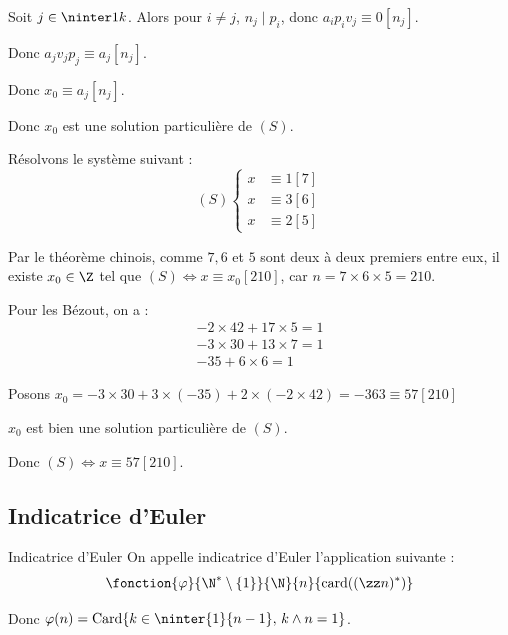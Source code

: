 Soit $j \in \ninter 1 k$. Alors pour $i \neq j$, $n_j \mid p_i$, donc $a_ip_iv_j \equiv 0 [n_j]$.

Donc $a_j v_j p_j \equiv a_j [n_j]$.

Donc $x_0 \equiv a_j [n_j]$.

Donc $x_0$ est une solution particulière de $(S)$.

\begin{exemple}
    Résolvons le système suivant : 
    \[
        (S) \left\{ 
            \begin{aligned}
                x & \equiv 1 [7] \\
                x & \equiv 3 [6] \\
                x & \equiv 2 [5]
            \end{aligned}
        \right.
    \]

    Par le théorème chinois, comme $7, 6$ et $5$ sont deux à deux premiers entre eux, 
    il existe $x_0 \in \Z$ tel que $(S) \Leftrightarrow x \equiv x_0 [210]$, car 
    $n = 7 \times 6 \times 5 = 210$.

    Pour les Bézout, on a :
    \[
        \begin{array}{rcl}
            -2 \times 42 + 17 \times 5 = 1 \\
            -3 \times 30 + 13 \times 7 = 1 \\
            - 35 + 6 \times 6 = 1
        \end{array}
    \]

    Posons $x_0 = -3 \times 30 + 3 \times (-35) + 2 \times (-2 \times 42) = -363 \equiv 57 [210] $

    $x_0$ est bien une solution particulière de $(S)$.

    Donc $(S) \Leftrightarrow x \equiv 57 [210]$.

\end{exemple}


\subsection{Indicatrice d'Euler }

\begin{definition}{Indicatrice d'Euler}{}
    On appelle indicatrice d'Euler l'application suivante : 
    $$\fonction{\varphi}{\N^* \setminus \{1 \}}{\N}{n}{\operatorname{card}((\zz n)^*)}$$

    Donc $\varphi(n) = \operatorname{Card}\{ k \in \ninter{1}{n - 1} , \, k \wedge n = 1\}$.

\end{definition}

